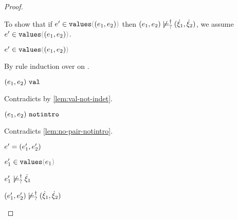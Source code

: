 \begin{proof}
\begin{byCases}
\begin{byCases}
\begin{byCases}
\begin{byCases}
\begin{pfsteps*}
          \end{pfsteps*} 
          To show that if $\inValues{e'}{\hpair{e_1}{e_2}}$ then $(e_1 , e_2) \not\models_{?}^{\dag} (\dot{\xi}_1 , \dot{\xi}_2)$, we assume $\inValues{e'}{\hpair{e_1}{e_2}}$.
          \begin{pfsteps*}
          \item $\inValues{e'}{\hpair{e_1}{e_2}}$  
          \end{pfsteps*}
          By rule induction over  on .
          \begin{byCases}
            \item[\text{(\ref{rule:IVVal})}]
            \begin{pfsteps*}
            \item $(e_1 , e_2) ~\mathtt{val}$ 
            \end{pfsteps*} 
            Contradicts  by \autoref{lem:val-not-indet}.
            \item[\text{(\ref{rule:IVIndet})}] 
            \begin{pfsteps*}
            \item $(e_1 , e_2) ~\mathtt{notintro}$ 
            \end{pfsteps*}
            Contradicts \autoref{lem:no-pair-notintro}.
            \item[\text{(\ref{rule:IVPair})}]
            \begin{pfsteps*}
            \item $e'=(e_1' , e_2')$ 
            \item $\inValues{e_1'}{e_1}$  
            \item $e_1' \not\models_{?}^{\dag} \dot{\xi}_1$  
            \item $(e_1' , e_2') \not\models_{?}^{\dag} (\dot{\xi}_1 , \dot{\xi}_2)$ 
            \end{pfsteps*} 
          \end{byCases}
        \end{byCases}
        \item[\cnotsatisfyormay{e_2}{\hxi_2}]
        \begin{pfsteps*}

\end{pfsteps*}
\end{byCases}
\end{byCases}
\end{byCases}
\end{proof}
